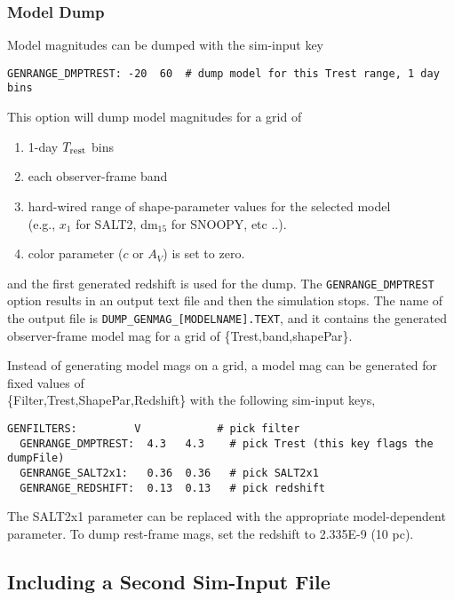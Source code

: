 \documentclass[12pt]{article}
\newcommand{\Trest}{T_{\rm rest}}
\begin{document}
   \subsubsection{ Model Dump }
   \label{sssec:model_dump}

Model magnitudes can be dumped with the sim-input key
\begin{Verbatim}[frame=single]
  GENRANGE_DMPTREST: -20  60  # dump model for this Trest range, 1 day bins
\end{Verbatim}
%
This option will dump model magnitudes for a grid of
\begin{enumerate}
 \item 1-day $\Trest$ bins
 \item each observer-frame band
 \item hard-wired range of shape-parameter values for the
   selected model \\ 
   (e.g., $x_1$ for SALT2, dm$_{15}$ for SNOOPY, etc ..).
 \item color parameter ($c$ or $A_V$) is set to zero.
\end{enumerate}
%
and the first generated redshift is used for the dump.
The {\tt GENRANGE\_DMPTREST} option results in an output
text file and then the simulation stops. The name of the 
output file is {\tt DUMP\_GENMAG\_[MODELNAME].TEXT},
and it contains the generated observer-frame model mag for 
a grid of \{Trest,band,shapePar\}. 

 
Instead of generating model mags on a grid,
a model mag can be generated for fixed values of \\ 
\{Filter,Trest,ShapePar,Redshift\} with the following
sim-input keys,
%
\begin{Verbatim}[frame=single]
  GENFILTERS:         V            # pick filter
  GENRANGE_DMPTREST:  4.3   4.3    # pick Trest (this key flags the dumpFile)
  GENRANGE_SALT2x1:   0.36  0.36   # pick SALT2x1
  GENRANGE_REDSHIFT:  0.13  0.13   # pick redshift
\end{Verbatim}
%
The SALT2x1 parameter can be replaced with the appropriate
model-dependent parameter. To dump rest-frame mags,
set the redshift to 2.335E-9 (10 pc).

   \subsection{Including a Second Sim-Input File}
   \label{subsec:split_siminput}
\end{document}
